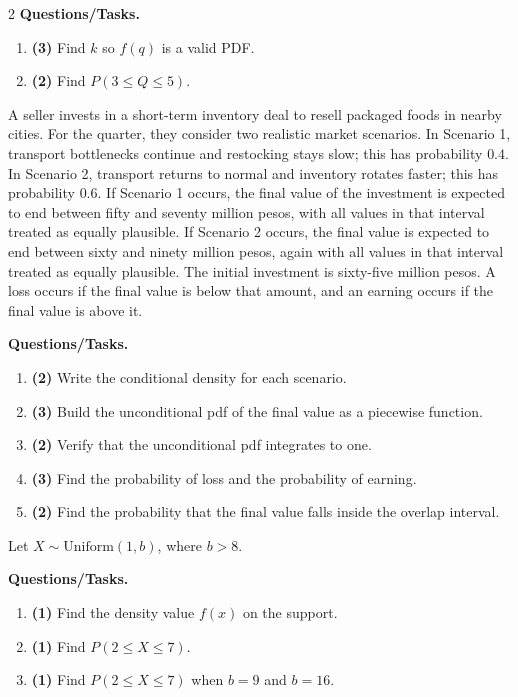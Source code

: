 \begin{multicols}{2}
		\textbf{Questions/Tasks.}
		\begin{enumerate}[label=\textbf{\alph*)}]
			\item \textbf{(3)} Find $k$ so $f(q)$ is a valid PDF.
			\item \textbf{(2)} Find $P(3\le Q\le 5)$.
		\end{enumerate}
		
		\vspace{0.25cm}
		\vspace{-0.3cm}
		A seller invests in a short-term inventory deal to resell packaged foods in nearby cities. For the quarter, they consider two realistic market scenarios. In Scenario 1, transport bottlenecks continue and restocking stays slow; this has probability $0.4$. In Scenario 2, transport returns to normal and inventory rotates faster; this has probability $0.6$. If Scenario 1 occurs, the final value of the investment is expected to end between fifty and seventy million pesos, with all values in that interval treated as equally plausible. If Scenario 2 occurs, the final value is expected to end between sixty and ninety million pesos, again with all values in that interval treated as equally plausible. The initial investment is sixty-five million pesos. A loss occurs if the final value is below that amount, and an earning occurs if the final value is above it.
		
		\textbf{Questions/Tasks.}
		\begin{enumerate}[label=\textbf{\alph*)}]
			\item \textbf{(2)} Write the conditional density for each scenario.
			\item \textbf{(3)} Build the unconditional pdf of the final value as a piecewise function.
			\item \textbf{(2)} Verify that the unconditional pdf integrates to one.
			\item \textbf{(3)} Find the probability of loss and the probability of earning.
			\item \textbf{(2)} Find the probability that the final value falls inside the overlap interval.
		\end{enumerate}
		
		\vspace{0.25cm}
		\vspace{-0.3cm}
		Let $X\sim \text{Uniform}(1,b)$, where $b>8$.
		
		\textbf{Questions/Tasks.}
		\begin{enumerate}[label=\textbf{\alph*)}]
			\item \textbf{(1)} Find the density value $f(x)$ on the support.
			\item \textbf{(1)} Find $P(2\le X\le 7)$.
			\item \textbf{(1)} Find $P(2\le X\le 7)$ when $b=9$ and $b=16$.
		\end{enumerate}
		

\end{multicols}
